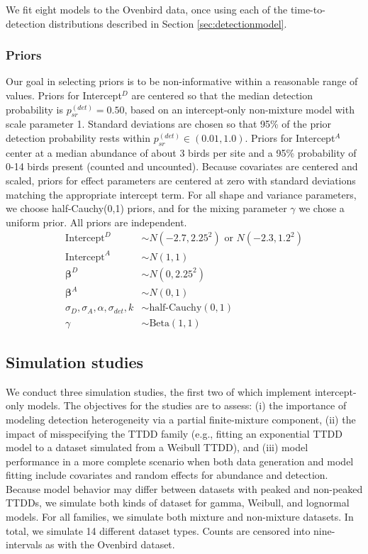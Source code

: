 \documentclass[useAMS,usenatbib,referee,12pt]{article}
\begin{document}
We fit eight models to the Ovenbird data, once using each of the time-to-detection distributions described in Section \ref{sec:detectionmodel}.

\subsubsection{Priors}\label{sec:priors}
Our goal in selecting priors is to be non-informative within a reasonable range of values.  Priors for Intercept$^D$ are centered so that the median detection probability is $p_{sr}^{(det)} = 0.50$, based on an intercept-only non-mixture model with scale parameter 1.  Standard deviations are chosen so that 95\% of the prior detection probability rests within $p_{sr}^{(det)} \in (0.01, 1.0)$.  Priors for Intercept$^A$ center at a median abundance of about 3 birds per site and a 95\% probability of 0-14 birds present (counted and uncounted).  Because covariates are centered and scaled, priors for effect parameters are centered at zero with standard deviations matching the appropriate intercept term.  For all shape and variance parameters, we choose half-Cauchy(0,1) priors, and for the mixing parameter $\gamma$ we chose a uniform prior.  All priors are independent.
\begin{align*}
\text{Intercept}^D &\sim N(-2.7, 2.25^2) \text{ or } N(-2.3, 1.2^2)\\
\text{Intercept}^A &\sim N(1, 1)\\
\boldsymbol{\beta}^D &\sim N(0, 2.25^2)\\
\boldsymbol{\beta}^A &\sim N(0, 1)\\
\sigma_D, \sigma_A, \alpha, \sigma_{det}, k &\sim \text{half-Cauchy}(0,1)\\
\gamma &\sim \text{Beta}(1,1)
\end{align*}



\subsection{Simulation studies}

We conduct three simulation studies, the first two of which implement intercept-only models.  The objectives for the studies are to assess: (i) the importance of modeling detection heterogeneity via a partial finite-mixture component, (ii) the impact of misspecifying the TTDD family (e.g., fitting an exponential TTDD model to a dataset simulated from a Weibull TTDD), and (iii) model performance in a more complete scenario when both data generation and model fitting include covariates and random effects for abundance and detection.  Because model behavior may differ between datasets with peaked and non-peaked TTDDs, we simulate both kinds of dataset for gamma, Weibull, and lognormal models.  For all families, we simulate both mixture and non-mixture datasets.  In total, we simulate 14 different dataset types.  Counts are censored into nine-intervals as with the Ovenbird dataset.
\end{document}
